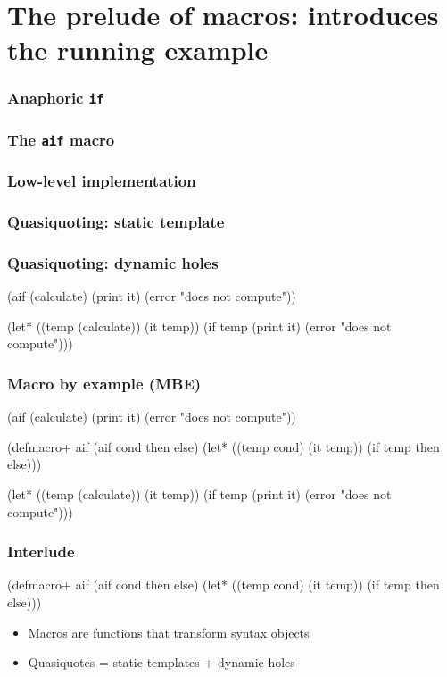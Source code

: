 \documentclass[svgnames,hyperref={bookmarks=false}]{beamer}
\begin{document}
\section{The prelude of macros: introduces the running example}

\begin{frame}[fragile]
\frametitle<1>{Anaphoric \texttt{if}}
\frametitle<2>{The \texttt{aif} macro}
\frametitle<3>{Low-level implementation}
\frametitle<4>{Quasiquoting: static template}
\frametitle<5>{Quasiquoting: dynamic holes}
\begin{semiverbatim}
(aif (calculate)
  (print it)
  (error "does not compute"))


(let* ((temp (calculate))
       (it temp))
  (if temp
    (print it)
    (error "does not compute")))
\end{semiverbatim}
\end{frame}

\begin{frame}[fragile]
\frametitle{Macro by example (MBE)}
\begin{semiverbatim}
(aif (calculate)
  (print it)
  (error "does not compute"))

(defmacro+ aif
  \alert{(aif cond then else)}
  (let* ((temp \alert{cond})
         (it temp))
    (if temp
        \alert{then}
        \alert{else})))

(let* ((temp (calculate))
       (it temp))
  (if temp
    (print it)
    (error "does not compute")))
\end{semiverbatim}
\end{frame}

\begin{frame}[fragile]
\frametitle{Interlude}

\begin{semiverbatim}
(defmacro+ aif
  (aif cond then else)
  (let* ((temp cond)
         (it temp))
    (if temp then else)))
\end{semiverbatim}

\vskip50pt

\begin{itemize}
\item Macros are functions that transform syntax objects
\item Quasiquotes = static templates + dynamic holes
\end{itemize}
\end{frame}
\end{document}
